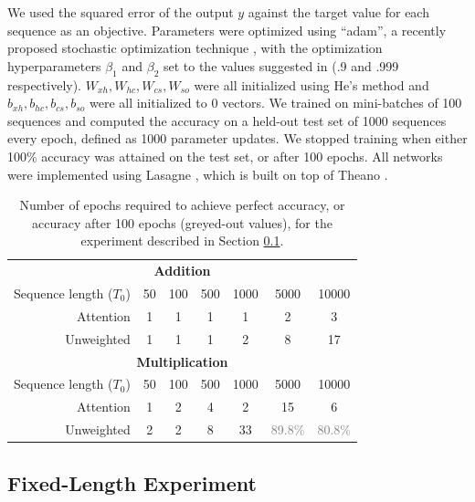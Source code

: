 \documentclass{article} %
\begin{document}
We used the squared error of the output $y$ against the target value for each sequence as an objective.
Parameters were optimized using ``adam'', a recently proposed stochastic optimization technique \cite{kingma2014adam}, with the optimization hyperparameters $\beta_1$ and $\beta_2$ set to the values suggested in \cite{kingma2014adam} (.9 and .999 respectively).
$W_{xh}, W_{hc}, W_{cs}, W_{so}$ were all initialized using He's method \cite{he2015delving} and $b_{xh}, b_{hc}, b_{cs}, b_{so}$ were all initialized to 0 vectors.
We trained on mini-batches of 100 sequences and computed the accuracy on a held-out test set of 1000 sequences every epoch, defined as 1000 parameter updates.
We stopped training when either 100\% accuracy was attained on the test set, or after 100 epochs.
All networks were implemented using Lasagne \cite{dieleman2015lasagne}, which is built on top of Theano \cite{bastien2012theano,bergstra2010theano}.

\begin{table}
  \centering
  \begin{tabular}{r c c c c c c}
    \toprule
    \multicolumn{7}{c}{\textbf{Addition}} \\
    Sequence length ($T_0$) & 50 & 100 & 500 & 1000 & 5000 & 10000 \\
    \cmidrule(r){2-7}
    Attention & 1 & 1 & 1 & 1 & 2 & 3 \\
    Unweighted & 1 & 1 & 1 & 2 & 8 & 17 \\
    \midrule
    \multicolumn{7}{c}{\textbf{Multiplication}} \\
    Sequence length ($T_0$) & 50 & 100 & 500 & 1000 & 5000 & 10000 \\
    \cmidrule(r){2-7}
    Attention & 1 & 2 & 4 & 2 & 15 & 6 \\
    Unweighted & 2 & 2 & 8 & 33 & \textcolor{gray}{89.8\%} & \textcolor{gray}{80.8\%} \\
    \bottomrule
  \end{tabular}
  \caption{Number of epochs required to achieve perfect accuracy, or accuracy after 100 epochs (greyed-out values), for the experiment described in Section \ref{sec:fixed}.}
  \label{tab:fixed}
\end{table}
\setlength{\textfloatsep}{14pt}

\subsection{Fixed-Length Experiment}
\label{sec:fixed}
\end{document}

